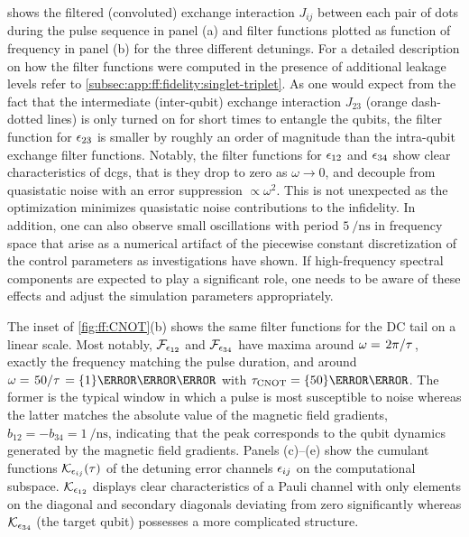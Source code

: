  shows the filtered (convoluted) exchange interaction $J_{ij}$ between each pair of dots during the pulse sequence in panel (a) and filter functions plotted as function of frequency in panel (b) for the three different detunings.
For a detailed description on how the filter functions were computed in the presence of additional leakage levels refer to \cref{subsec:app:ff:fidelity:singlet-triplet}.
As one would expect from the fact that the intermediate (inter-qubit) exchange interaction $J_{23}$ (orange dash-dotted lines) is only turned on for short times to entangle the qubits, the filter function for $\epsilon_{23}$ is smaller by roughly an order of magnitude than the intra-qubit exchange filter functions.
Notably, the filter functions for $\epsilon_{12}$ and $\epsilon_{34}$ show clear characteristics of \glspl{dcg}, that is they drop to zero as $\omega\rightarrow 0$, and decouple from quasistatic noise with an error suppression $\propto\omega^2$.
This is not unexpected as the optimization minimizes quasistatic noise contributions to the infidelity.
In addition, one can also observe small oscillations with period $\qty{5}{\per\nano\second}$ in frequency space that arise as a numerical artifact of the piecewise constant discretization of the control parameters as investigations have shown.
If high-frequency spectral components are expected to play a significant role, one needs to be aware of these effects and adjust the simulation parameters appropriately.

The inset of \cref{fig:ff:CNOT}(b) shows the same filter functions for the DC tail on a linear scale.
Most notably, $\mathcal{F}_{\epsilon_{12}}$ and $\mathcal{F}_{\epsilon_{34}}$ have maxima around $\omega = \flatfrac{2\pi}{\tau}$, \ie exactly the frequency matching the pulse duration, and around $\omega = \flatfrac{50}{\tau} = \qty{1}{\per\nano\second}$ with $\tau_{\CNOT} = \qty{50}{\nano\second}$.
The former is the typical window in which a pulse is most susceptible to noise whereas the latter matches the absolute value of the magnetic field gradients, $b_{12} = -b_{34} = \qty{1}{\per\nano\second}$, indicating that the peak corresponds to the qubit dynamics generated by the magnetic field gradients.
Panels (c)--(e) show the cumulant functions $\mathcal{K}_{\epsilon_{ij}}(\tau)$ of the detuning error channels $\epsilon_{ij}$ on the computational subspace.
$\mathcal{K}_{\epsilon_{12}}$ displays clear characteristics of a Pauli channel with only elements on the diagonal and secondary diagonals deviating from zero significantly whereas $\mathcal{K}_{\epsilon_{34}}$ (the target qubit) possesses a more complicated structure.

